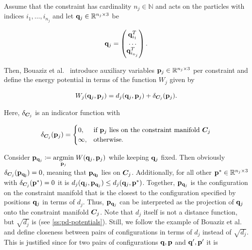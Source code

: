 Assume that the constraint has cardinality 
$n_j \in \mathbb{N}$ and acts on the particles with indices $i_1, \ldots, i_{n_j}$ and let $\mathbf{q}_j \in \mathbb{R}^{n_j \times 3}$ be

\[
    \mathbf{q}_j = \begin{pmatrix}
        \mathbf{q}_{i_1}^T \\
        \ldots \\
        \mathbf{q}_{i_{n_j}}^T
    \end{pmatrix}.
\]

\noindent Then, Bouaziz et al.\ \cite{bouaziz2014} introduce auxiliary variables $\mathbf{p}_j \in \mathbb{R}^{n_j \times 3}$ per constraint 
and define the energy potential in terms of the function $W_j$ given by 

\begin{equation}\label{eq:pd-Wj}
    W_j(\mathbf{q}_j, \mathbf{p}_j) = d_j(\mathbf{q}_j, \mathbf{p}_j) + \delta_{\bm{C}_j}(\mathbf{p}_j).
\end{equation}

\noindent Here, $\delta_{\bm{C}_j}$ is an indicator function with 

\[
\delta_{\bm{C}_j}(\mathbf{p}_j)= 
\begin{cases}
0,& \text{if } \mathbf{p}_j \text{ lies on the constraint manifold } \bm{C}_j \\
\infty,& \text{otherwise.}
\end{cases}
\]

\noindent Consider $\mathbf{p}_{\mathbf{q}_j} \coloneqq \underset{\mathbf{p}_j}{\operatorname{argmin}}\; W(\mathbf{q}_j, \mathbf{p}_j)$ while keeping $\mathbf{q}_j$ 
fixed. Then obviously 
$\delta_{\bm{C}_j}(\mathbf{p_{\mathbf{q}_j}}) = 0$, meaning that $\mathbf{p_{\mathbf{q}_j}}$ lies on $\bm{C}_j$. Additionally, 
for all other
$\mathbf{p}^* \in \mathbb{R}^{n_j \times 3}$ with $\delta_{\bm{C}_j}(\mathbf{p}^*) = 0$ it is $d_j(\mathbf{q}_j, \mathbf{p}_{\mathbf{q}_j}) 
\leq
d_j(\mathbf{q}_j, \mathbf{p}^*)$. Together, $\mathbf{p}_{\mathbf{q}_j}$ is the configuration on the constraint manifold that is the closest to 
the configuration specified by positions $\mathbf{q}_j$ in terms of $d_j$. Thus, $\mathbf{p}_{\mathbf{q}_j}$ can be 
interpreted as the projection of $\mathbf{q}_j$ onto the constraint manifold $\bm{C}_j$. Note that $d_j$ itself is not a distance 
function, but $\sqrt{d_j}$ is (see \cref{ss:pd-potentials}). Still, we follow the example of Bouaziz et al.\ \cite{bouaziz2014} 
and define closeness between pairs of configurations in terms of $d_j$ instead of $\sqrt{d_j}$. This is justified since for two pairs
of configurations $\mathbf{q}, \mathbf{p}$ and $\mathbf{q}^\prime, \mathbf{p}^\prime$ it is 

